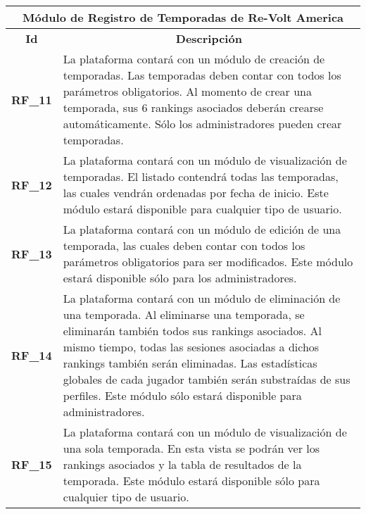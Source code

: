 \begin{center}
	\begin{tabular}{ | l | p{15cm} |}
		\hline
		\multicolumn{2}{|c|}{\textbf{Módulo de Registro de Temporadas de Re-Volt America}} \\
		\hline
		\multicolumn{1}{|c|}{\textbf{Id}} & \multicolumn{1}{|c|}{\textbf{Descripción}} \\
		\hline
		{\textbf{RF\_11}} & La plataforma contará con un módulo de creación de temporadas. Las temporadas deben contar con todos los parámetros obligatorios. Al momento de crear una temporada, sus 6 rankings asociados deberán crearse automáticamente. Sólo los administradores pueden crear temporadas. \\ \hline
		
		{\textbf{RF\_12}} & La plataforma contará con un módulo de visualización de temporadas. El listado contendrá todas las temporadas, las cuales vendrán ordenadas por fecha de inicio. Este módulo estará disponible para cualquier tipo de usuario. \\ \hline
		
		{\textbf{RF\_13}} & La plataforma contará con un módulo de edición de una temporada, las cuales deben contar con todos los parámetros obligatorios para ser modificados. Este módulo estará disponible sólo para los administradores. \\ \hline
		
		{\textbf{RF\_14}} & La plataforma contará con un módulo de eliminación de una temporada. Al eliminarse una temporada, se eliminarán también todos sus rankings asociados. Al mismo tiempo, todas las sesiones asociadas a dichos rankings también serán eliminadas. Las estadísticas globales de cada jugador también serán substraídas de sus perfiles. Este módulo sólo estará disponible para administradores. \\ \hline
		
		{\textbf{RF\_15}} & La plataforma contará con un módulo de visualización de una sola temporada. En esta vista se podrán ver los rankings asociados y la tabla de resultados de la temporada. Este módulo estará disponible sólo para cualquier tipo de usuario.\\ \hline
	\end{tabular}
\end{center}

